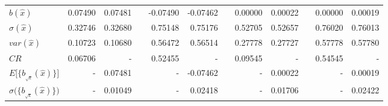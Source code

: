 \documentclass[report,12pt]{report}
\begin{document}
\begin{table}[H]
{\begin{tabular}{lrrlrrlrrlrr}
\multicolumn{1}{|l|}{$b(\hat x)$}                                    & \multicolumn{1}{r|}{0.07490} & \multicolumn{1}{r|}{0.07481} & \multicolumn{1}{l|}{} & \multicolumn{1}{r|}{-0.07490} & \multicolumn{1}{r|}{-0.07462} & \multicolumn{1}{l|}{} & \multicolumn{1}{r|}{0.00000} & \multicolumn{1}{r|}{0.00022} & \multicolumn{1}{l|}{} & \multicolumn{1}{r|}{0.00000} & \multicolumn{1}{r|}{0.00019} \\
\multicolumn{1}{|l|}{$\sigma(\hat x)$}                               & \multicolumn{1}{r|}{0.32746} & \multicolumn{1}{r|}{0.32680} & \multicolumn{1}{l|}{} & \multicolumn{1}{r|}{0.75148}  & \multicolumn{1}{r|}{0.75176}  & \multicolumn{1}{l|}{} & \multicolumn{1}{r|}{0.52705} & \multicolumn{1}{r|}{0.52657} & \multicolumn{1}{l|}{} & \multicolumn{1}{r|}{0.76020} & \multicolumn{1}{r|}{0.76013} \\
\multicolumn{1}{|l|}{$var(\hat x)$}                                  & \multicolumn{1}{r|}{0.10723} & \multicolumn{1}{r|}{0.10680} & \multicolumn{1}{l|}{} & \multicolumn{1}{r|}{0.56472}  & \multicolumn{1}{r|}{0.56514}  & \multicolumn{1}{l|}{} & \multicolumn{1}{r|}{0.27778} & \multicolumn{1}{r|}{0.27727} & \multicolumn{1}{l|}{} & \multicolumn{1}{r|}{0.57778} & \multicolumn{1}{r|}{0.57780} \\ \cline{1-3} \cline{5-6} \cline{8-9} \cline{11-12} 
\multicolumn{1}{|l|}{$CR$}                                           & \multicolumn{1}{r|}{0.06706} & \multicolumn{1}{r|}{-}       & \multicolumn{1}{l|}{} & \multicolumn{1}{r|}{0.52455}  & \multicolumn{1}{r|}{-}        & \multicolumn{1}{l|}{} & \multicolumn{1}{r|}{0.09545} & \multicolumn{1}{r|}{-}       & \multicolumn{1}{l|}{} & \multicolumn{1}{r|}{0.54545} & \multicolumn{1}{r|}{-}       \\ \cline{1-3} \cline{5-6} \cline{8-9} \cline{11-12} 
\multicolumn{1}{|l|}{$E\big [\{b_{_{\sqrt{k}}}(\hat x)\}\big ]$}     & \multicolumn{1}{r|}{-}       & \multicolumn{1}{r|}{0.07481} & \multicolumn{1}{l|}{} & \multicolumn{1}{r|}{-}        & \multicolumn{1}{r|}{-0.07462} & \multicolumn{1}{l|}{} & \multicolumn{1}{r|}{-}       & \multicolumn{1}{r|}{0.00022} & \multicolumn{1}{l|}{} & \multicolumn{1}{r|}{-}       & \multicolumn{1}{r|}{0.00019} \\
\multicolumn{1}{|l|}{$\sigma \big(\{b_{_{\sqrt{k}}}(\hat x)\}\big)$} & \multicolumn{1}{r|}{-}       & \multicolumn{1}{r|}{0.01049} & \multicolumn{1}{l|}{} & \multicolumn{1}{r|}{-}        & \multicolumn{1}{r|}{0.02418}  & \multicolumn{1}{l|}{} & \multicolumn{1}{r|}{-}       & \multicolumn{1}{r|}{0.01706} & \multicolumn{1}{l|}{} & \multicolumn{1}{r|}{-}       & \multicolumn{1}{r|}{0.02422} \\ \cline{1-3} \cline{5-6} \cline{8-9} \cline{11-12} 

\end{tabular}}
\end{table}
\end{document}

